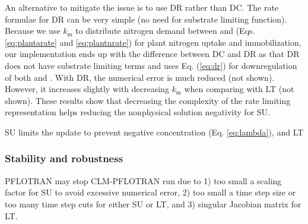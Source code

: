 \documentclass[gmd, manuscript]{copernicus}
\begin{document}
An alternative to mitigate the issue is to use DR rather than DC. The rate
formulae for DR can be very simple (no need for substrate limiting function).
Because we use $k_\text{m}$ to distribute nitrogen demand between 
and  (Eqs. \ref{eq:plantarate} and \ref{eq:plantnrate}) for plant
nitrogen uptake and immobilization, our implementation ends up with the
difference between DC and DR as that DR does not have  substrate
limiting terms and uses Eq. (\ref{eq:dr}) for downregulation of both
 and . With DR, the numerical error is much reduced
(not shown). However, it increases
slightly with decreasing $k_\text{m}$ when comparing with LT (not shown). These
results show that decreasing the complexity of the rate limiting representation
helps reducing the nonphysical solution negativity for SU.



SU limits the update to prevent negative concentration (Eq. \ref{eq:lambda}), and LT  
   
\subsubsection{Stability and robustness}
PFLOTRAN may stop CLM-PFLOTRAN run due to  1) too small a scaling factor for SU
to avoid excessive numerical error, 2) too small a time step size or too many
time step cuts for either SU or LT, and 3) singular Jacobian matrix for LT. 
\end{document}
